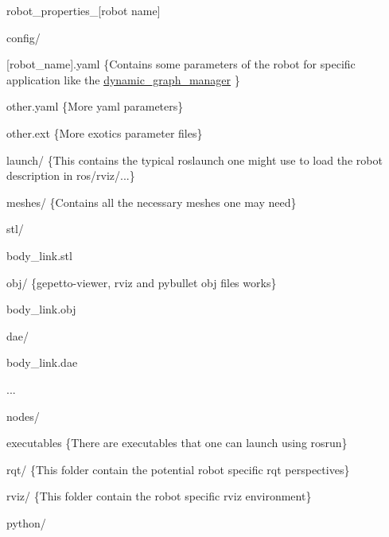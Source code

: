 \begin{DoxyItemize}
\item robot\+\_\+properties\+\_\+\mbox{[}robot name\mbox{]}
\begin{DoxyItemize}
\item config/
\begin{DoxyItemize}
\item \mbox{[}robot\+\_\+name\mbox{]}.yaml \{Contains some parameters of the robot for specific application like the \hyperlink{namespacedynamic__graph__manager}{dynamic\+\_\+graph\+\_\+manager} \}
\item other.\+yaml \{More yaml parameters\}
\item other.\+ext \{More exotics parameter files\}
\end{DoxyItemize}
\item launch/ \{This contains the typical roslaunch one might use to load the robot description in ros/rviz/...\}
\item meshes/ \{Contains all the necessary meshes one may need\}
\begin{DoxyItemize}
\item stl/
\begin{DoxyItemize}
\item body\+\_\+link.\+stl
\end{DoxyItemize}
\item obj/ \{gepetto-\/viewer, rviz and pybullet obj files works\}
\begin{DoxyItemize}
\item body\+\_\+link.\+obj
\end{DoxyItemize}
\item dae/
\begin{DoxyItemize}
\item body\+\_\+link.\+dae
\end{DoxyItemize}
\item ...
\end{DoxyItemize}
\item nodes/
\begin{DoxyItemize}
\item executables \{There are executables that one can launch using rosrun\}
\end{DoxyItemize}
\item rqt/ \{This folder contain the potential robot specific rqt perspectives\}
\item rviz/ \{This folder contain the robot specific rviz environment\}
\item python/
\begin{DoxyItemize}

\end{DoxyItemize}
\end{DoxyItemize}
\end{DoxyItemize}
